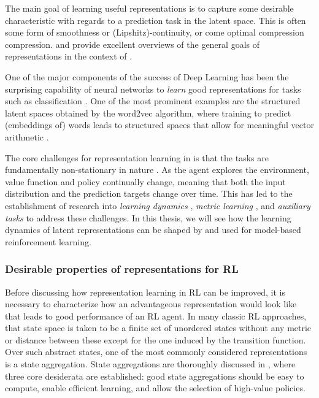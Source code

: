 The main goal of learning useful representations is to capture some desirable characteristic with regards to a prediction task in the latent space.
This is often some form of smoothness or (Lipshitz)-continuity, or come optimal compression compression.
\textcite{abel2020thesis} and \textcite{le2021metrics} provide excellent overviews of the general goals of representations in the context of .

One of the major components of the success of Deep Learning has been the surprising capability of neural networks to \emph{learn} good representations for tasks such as classification \parencite{bengio2012representation}.
One of the most prominent examples are the structured latent spaces obtained by the word2vec algorithm, where training to predict (embeddings of) words leads to structured spaces that allow for meaningful vector arithmetic \parencite{mikolov2013distirbuted,goldberg2014word2vec}.

The core challenges for representation learning in  is that the tasks are fundamentally non-stationary in nature \parencite{kumar2022dr,nikishin2022primacy}.
As the agent explores the environment, value function and policy continually change, meaning that both the input distribution and the prediction targets change over time.
This has led to the establishment of research into \emph{learning dynamics} \parencite{lyle2021earning,lyle2022understanding}, \emph{metric learning} \parencite{ferns2011bisimulation,barreto2017successor,borsa2018universal,le2021metrics}, and \emph{auxiliary tasks} \parencite{jaderberg2017reinforcement,bellemare2019geometric,lyle2021effect,farebrother2023protovalue} to address these challenges.
In this thesis, we will see how the learning dynamics of latent representations can be shaped by and used for model-based reinforcement learning.

\subsubsection{Desirable properties of representations for RL}

Before discussing how representation learning in RL can be improved, it is necessary to characterize how an advantageous representation would look like that leads to good performance of an RL agent.
In many classic RL approaches, that state space is taken to be a finite set of unordered states without any metric or distance between these except for the one induced by the transition function.
Over such abstract states, one of the most commonly considered representations is a state aggregation.
State aggregations are thoroughly discussed in \textcite{abel2020thesis}, where three core desiderata are established: good state aggregations should be easy to compute, enable efficient learning, and allow the selection of high-value policies.

